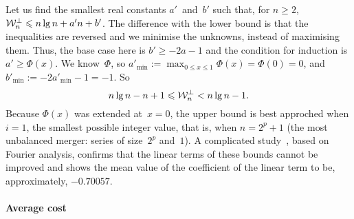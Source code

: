Let us find the smallest real constants \(a'\)~and~\(b'\) such that,
for \(n \geqslant 2\), \(\mathcal{W}_{n}^{\bot} \leqslant n\lg n + a'n + b'\).
The difference with the lower bound is that the inequalities are
reversed and we minimise the unknowns, instead of maximising
them. Thus, the base case here is \(b' \geqslant -2a - 1\) and the
condition for induction is \(a' \geqslant \Phi(x)\). We know~\(\Phi\),
so \(a'_{\min} := \max_{0 \leqslant x \leqslant 1}\Phi(x) = \Phi(0) =
0\), and \(b'_{\min} := -2a'_{\min} - 1 = -1\). So
\begin{equation}
n\lg n - n + 1 \leqslant \mathcal{W}_{n}^{\bot} < n\lg n - 1.
\label{ineq:OWbms}
\end{equation}
Because \(\Phi(x)\) was extended at~\(x=0\), the upper bound is best
approched when \(i=1\), the smallest possible integer value, that is,
when \(n=2^p+1\) (the most unbalanced merger: series of size~\(2^p\)
and~\(1\)). A complicated study~\cite{PannyProdinger:1995}, based on
Fourier analysis, confirms that the linear terms of these bounds
cannot be improved and shows the mean value of the coefficient of the
linear term to be, approximately, \(-0.70057\).

\paragraph{Average cost}

